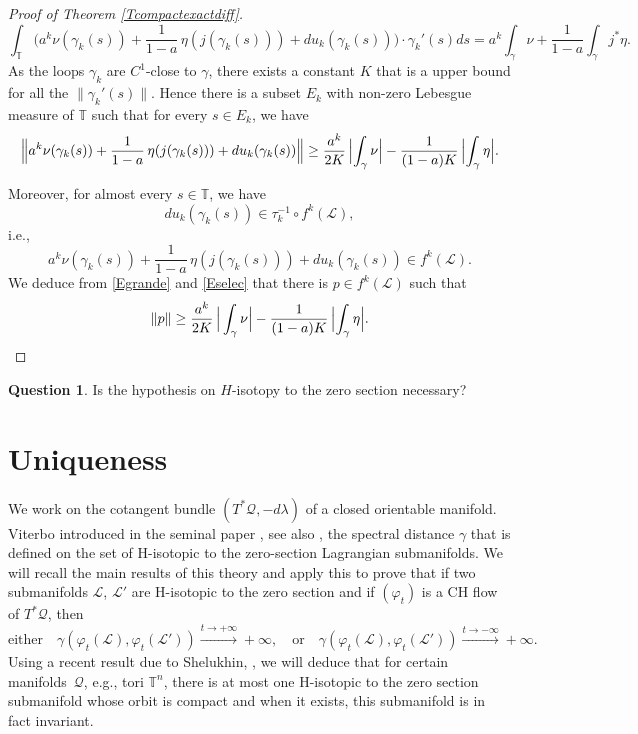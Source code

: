 \documentclass[11pt]{article}
\newcommand{\ie}{i.e.,\xspace}
\newcommand{\eg}{e.g.,\xspace}
\numberwithin{equation}{section}
\numberwithin{figure}{section}
\numberwithin{table}{section}
\theoremstyle{definition}
\newtheorem*{question*}{Question}
\def\T{\mathbb{T}}
\def\cL{{\mathcal L}}
\def\cQ{{\mathcal Q}}
\begin{document}
\begin{proof}[Proof of Theorem \ref{Tcompactexactdiff}]
\[
\int_\T \Big( a^k\nu(\gamma_k(s))+\frac{1}{1-a}\,\eta(j(\gamma_k(s)))+du_k(\gamma_k(s))\Big)\cdot \gamma_k'(s)ds=a^k\int_\gamma\nu+\frac{1}{1-a}\int_\gamma j^*\eta.
\]
As the loops $\gamma_k$ are $C^1$-close to $\gamma$, there exists a constant $K$ that is a upper bound for all the $\| \gamma_k'(s)\|$. Hence there is a subset $E_k$ with non-zero Lebesgue measure of $\T$ such that for every $s\in E_k$, we have
\begin{equation}\label{Egrande}
\Bigl\|a^k\nu(\gamma_k(s))+\frac{1}{1-a}\,\eta(j(\gamma_k(s)))+du_k(\gamma_k(s))\Bigr\|\geq \frac{a^k}{2K}\,\Bigl\vert\int_\gamma\nu\Bigr\vert-\frac{1}{(1-a)K}\,\Bigl\vert\int_\gamma\eta\Bigr\vert.\end{equation}

Moreover, for almost every $s\in\T$, we have
\[
du_k(\gamma_k(s))\in \tau_{k}^{-1}\circ f^k(\cL),
\]
\ie
\begin{equation}\label{Eselec}
a^k\nu(\gamma_k(s))+\frac{1}{1-a}\,\eta(j(\gamma_k(s)))+du_k(\gamma_k(s))\in f^k(\cL).
\end{equation}
We deduce from \eqref{Egrande} and \eqref{Eselec} that there is $p\in f^k(\cL)$ such that
\[
\| p\|\geq \frac{a^k}{2K}\,\Big\vert\int_\gamma\nu\Big\vert-\frac{1}{(1-a)K}\,\Bigl\vert\int_\gamma\eta\Bigr\vert.\qedhere
\]
\end{proof}

\begin{question*}
Is the hypothesis on $H$-isotopy to the zero section necessary?
\end{question*}

\section{Uniqueness}\label{Suniqueness}

We work on the cotangent bundle $(T^*\cQ, -d\lambda)$ of a closed orientable manifold.
Viterbo introduced in the seminal paper \cite{Vit1992}, see also \cite{Vit2008}, the spectral distance $\gamma$ that is defined on the set of H-isotopic to the zero-section Lagrangian submanifolds.
We will recall the main results of this theory and apply this to prove that if two submanifolds $\cL$, $\cL'$ are H-isotopic to the zero section and if $(\varphi_t)$ is a CH flow of $T^*\cQ$, then
\[
\text{either}\quad\gamma (\varphi_t(\cL), \varphi_t(\cL'))\xrightarrow[]{t\to +\infty}+\infty,\quad\text{or}\quad\gamma (\varphi_t(\cL), \varphi_t(\cL'))\xrightarrow[]{t\to -\infty}+\infty.
\]
Using a recent result due to Shelukhin, \cite{Shel2020}, we will deduce that for certain manifolds~$\cQ$, \eg tori $\T^n$, there is at most one H-isotopic to the zero section submanifold whose orbit is compact and when it exists, this submanifold is in fact invariant.
\end{document}
